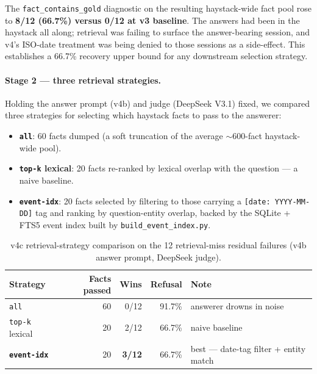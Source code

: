 \documentclass{article}
\begin{document}
The \texttt{fact\_contains\_gold} diagnostic on the resulting haystack-wide fact pool rose to \textbf{8/12 (66.7\%) versus 0/12 at v3 baseline}. The answers had been in the haystack all along; retrieval was failing to surface the answer-bearing session, and v4's ISO-date treatment was being denied to those sessions as a side-effect. This establishes a 66.7\% recovery upper bound for any downstream selection strategy.

\paragraph{Stage 2 --- three retrieval strategies.} Holding the answer prompt (v4b) and judge (DeepSeek V3.1) fixed, we compared three strategies for selecting which haystack facts to pass to the answerer:

\begin{itemize}
  \item \textbf{\texttt{all}}: 60 facts dumped (a soft truncation of the average $\sim$600-fact haystack-wide pool).
  \item \textbf{\texttt{top-k} lexical}: 20 facts re-ranked by lexical overlap with the question --- a naive baseline.
  \item \textbf{\texttt{event-idx}}: 20 facts selected by filtering to those carrying a \texttt{[date: YYYY-MM-DD]} tag and ranking by question-entity overlap, backed by the SQLite + FTS5 event index built by \texttt{build\_event\_index.py}.
\end{itemize}

\begin{table}[h]
\centering
\small
\caption{v4c retrieval-strategy comparison on the 12 retrieval-miss residual failures (v4b answer prompt, DeepSeek judge).}
\label{tab:v4c}
\begin{tabular}{lrrrl}
\toprule
Strategy             & Facts passed & Wins   & Refusal & Note                                      \\
\midrule
\texttt{all}         & 60           & 0/12   & 91.7\%  & answerer drowns in noise                  \\
\texttt{top-k} lexical & 20         & 2/12   & 66.7\%  & naive baseline                            \\
\textbf{\texttt{event-idx}} & 20    & \textbf{3/12} & 66.7\% & best --- date-tag filter + entity match \\
\bottomrule
\end{tabular}
\end{table}
\end{document}

